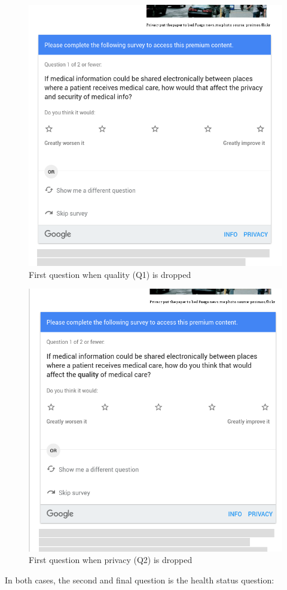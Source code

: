 \begin{figure}
	\includegraphics[width=\textwidth]{Selection_354.png}
	\caption{\label{fig:q1dropped}First question when quality (Q1) is dropped}
\end{figure}
\begin{figure}
	\includegraphics[width=\textwidth]{Selection_356.png}
	\caption{\label{fig:q2dropped}First question when privacy (Q2) is dropped}
\end{figure}
In both cases, the second and final question is the health status question:

